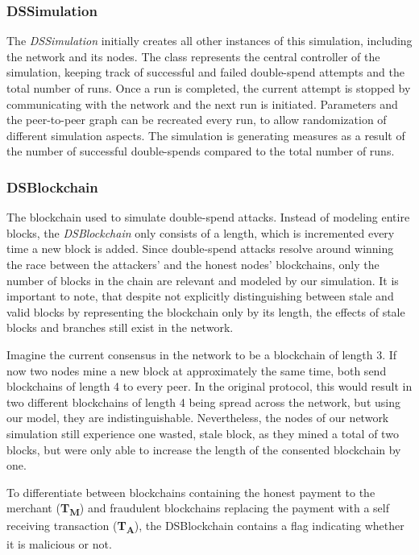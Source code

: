 \documentclass[a4paper,12pt,twoside]{report}
\begin{document}
\subsubsection{DSSimulation}
The \textit{DSSimulation} initially creates all other instances of this simulation, including the network and its nodes. The class represents the central controller of the simulation, keeping track of successful and failed double-spend attempts and the total number of runs. Once a run is completed, the current attempt is stopped by communicating with the network and the next run is initiated. Parameters and the peer-to-peer graph can be recreated every run, to allow randomization of different simulation aspects. The simulation is generating measures as a result of the number of successful double-spends compared to the total number of runs.
\subsubsection{DSBlockchain}
The blockchain used to simulate double-spend attacks. Instead of modeling entire blocks, the \textit{DSBlockchain} only consists of a length, which is incremented every time a new block is added. Since double-spend attacks resolve around winning the race between the attackers' and the honest nodes' blockchains, only the number of blocks in the chain are relevant and modeled by our simulation. It is important to note, that despite not explicitly distinguishing between stale and valid blocks by representing the blockchain only by its length, the effects of stale blocks and branches still exist in the network. 

Imagine the current consensus in the network to be a blockchain of length 3. If now two nodes mine a new block at approximately the same time, both send blockchains of length 4 to every peer. In the original protocol, this would result in two different blockchains of length 4 being spread across the network, but using our model, they are indistinguishable. Nevertheless, the nodes of our network simulation still experience one wasted, stale block, as they mined a total of two blocks, but were only able to increase the length of the consented blockchain by one.

To differentiate between blockchains containing the honest payment to the merchant (\textbf{T\textsubscript{M}}) and fraudulent blockchains replacing the payment with a self receiving transaction (\textbf{T\textsubscript{A}}), the DSBlockchain contains a flag indicating whether it is malicious or not.
\end{document}
